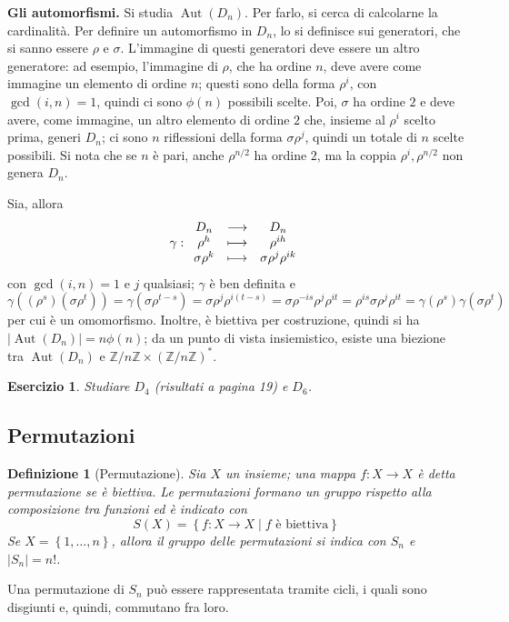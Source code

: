 \documentclass[11pt]{scrartcl}
\theoremstyle{style1}
\newtheorem{definizione}{Definizione}[section]
\newtheorem{esercizio}{Esercizio}[section]
\numberwithin{equation}{subsection}
\renewcommand{\textbf}[1]{\textsf{\bfseries #1}}
\begin{document}
\vspace{5pt}
\textbf{Gli automorfismi.} 
Si studia $\operatorname{Aut} (D_n)$. Per farlo, si cerca di calcolarne la cardinalit\`a.
Per definire un automorfismo in $D_n$, lo si definisce sui generatori, che si sanno essere $\rho $ e $\sigma $.
L'immagine di questi generatori deve essere un altro generatore: ad esempio, l'immagine di $\rho $, che ha ordine $n$, deve avere come immagine un elemento di ordine $n$; questi sono della forma $\rho ^i$, con $\operatorname{gcd}(i,n) =1$, quindi ci sono $\phi (n)$ possibili scelte.
Poi, $\sigma $ ha ordine $2$ e deve avere, come immagine, un altro elemento di ordine $2$ che, insieme al $\rho ^i$ scelto prima, generi $D_n$; ci sono $n$ riflessioni della forma $\sigma \rho ^j$, quindi un totale di $n$ scelte possibili.
Si nota che se $n$ \`e pari, anche $\rho ^{ n / 2} $ ha ordine $2$, ma la coppia $\rho ^i, \rho ^{n / 2} $ non genera $D_n$.

Sia, allora 
\[
\gamma : 
\begin{array}
	{c c c}
	D_n & \longrightarrow & D_n\\
	\rho ^h & \longmapsto & \rho ^{ih} \\
	\sigma \rho ^k & \longmapsto & \sigma \rho ^j \rho ^{ik} 
\end{array}
\] 
con $\operatorname{gcd}(i,n) =1$ e $j$ qualsiasi; $\gamma$ \`e ben definita e 
\[
\gamma\left((\rho ^s)(\sigma \rho ^t)\right) = \gamma(\sigma \rho ^{t-s} )= \sigma \rho ^j \rho ^{i(t-s)} = \sigma \rho ^{-is} \rho ^j \rho ^{it} = \rho ^{is} \sigma \rho ^j\rho ^{it} = \gamma(\rho ^s)\gamma(\sigma \rho ^t)
\] 
per cui \`e un omomorfismo. 
Inoltre, \`e biettiva per costruzione, quindi si ha $\lvert \operatorname{Aut} (D_n) \rvert = n \phi (n)$; da un punto di vista insiemistico, esiste una biezione tra $\operatorname{Aut} (D_n)$ e $\mathbb{Z} / n\mathbb{Z} \times \left(\mathbb{Z} / n\mathbb{Z}\right) ^*$.
\begin{esercizio}
	Studiare $D_4$ (risultati a pagina 19) e $D_6$.
\end{esercizio}
\subsection{Permutazioni}
\begin{definizione}
	[Permutazione]	
	Sia $X$ un insieme; una mappa $f : X \to X$ \`e detta \textit{permutazione} se \`e biettiva. 
	Le permutazioni formano un gruppo rispetto alla composizione tra funzioni ed \`e indicato con
	\[
	S(X) = \left\{ f : X \to X  \mid  f \text{ \`e biettiva} \right\} 
	\] 
	Se $X = \left\{ 1,\ldots, n \right\} $, allora il gruppo delle permutazioni si indica con $S_n$ e $\lvert S_n \rvert  = n!$.
\end{definizione}
\noindent Una permutazione di $S_n$ pu\`o essere rappresentata tramite cicli, i quali sono disgiunti e, quindi, commutano fra loro.
\end{document}
